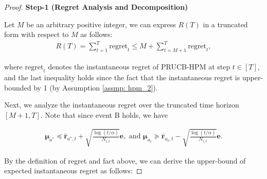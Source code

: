 \begin{proof}
\textbf{Step-1 (Regret Analysis and Decomposition)}

Let $M$ be an arbitrary positive integer, we can express $R(T)$ in a truncated form with respect to $M$ as follows:
\begin{equation}
\begin{aligned}
\label{eq: trunc_regret_0}
R(T) = \sum_{t=1}^{T} \text{regret}_{t} \leq M + \sum_{t=M+1}^{T} \text{regret}_{t},
\end{aligned}
\end{equation}

where $\text{regret}_{t}$ denotes the instantaneous regret of PRUCB-HPM at step $t \in \left[ T \right]$, and the last inequality holds since the fact that the instantaneous regret is upper-bounded by 1 (by Assumption \ref{assmp: hpm_2}).

Next, we analyze the instantaneous regret over the truncated time horizon $[M+1, T]$.
Note that since event B holds, we have 

\begin{equation}
\begin{aligned}
\label{eq: a^*_confidence_hidden}
\boldsymbol{\mu}_{a^*} \preceq \boldsymbol{\hat{r}}_{a^*,t} + \sqrt{\frac{ \log(t/\alpha)}{N_{i,t}}} \boldsymbol{e}, 
\text{ and }
\boldsymbol{\mu}_{a_t} \succeq  \boldsymbol{\hat{r}}_{a_t, t} - \sqrt{\frac{ \log(t/\alpha)}{N_{i,t}}} \boldsymbol{e}.
\end{aligned}
\end{equation}

By the definition of regret and fact above, we can derive the upper-bound of expected instantaneous regret as follows:


\end{proof}
